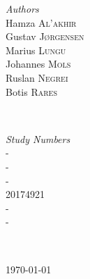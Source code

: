 \documentclass[12p]{article}
\begin{document}
\begin{titlepage}
	
	\begin{minipage}{0.4\textwidth}
    \begin{flushleft} \large
    \emph{Authors}\\
        Hamza \textsc{Al'akhir} \\
    	Gustav \textsc{Jørgensen} \\
    	Marius \textsc{Lungu} \\
    	Johannes \textsc{Mols} \\
    	Ruslan \textsc{Negrei} \\
    	Botis \textsc{Rares} \\
    \end{flushleft}
    \end{minipage}
    ~
    \begin{minipage}{0.4\textwidth}
    \begin{flushright} \large
    \emph{Study Numbers} \\
        - \\
        - \\
        - \\
        20174921 \\
        - \\
        - \\
    \end{flushright}
    \end{minipage}\\[0.5cm]

	
	\vfill\vfill\vfill %
	
	{\large\today} %
	
    
\end{titlepage}


\tableofcontents %

\newpage %
\end{document}
